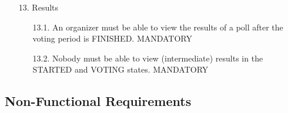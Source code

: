 \begin{enumerate}
\item[13.] Results

	\begin{enumerate}
	\item[13.1.] An organizer must be able to view the results of a poll after the voting period is FINISHED.
	MANDATORY
	
	
	\item[13.2.] Nobody must be able to view (intermediate) results in the STARTED and VOTING states.
	MANDATORY
	\end{enumerate}



\end{enumerate}

\subsection{Non-Functional Requirements}

